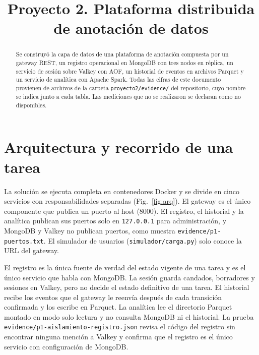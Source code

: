 \documentclass[conference]{IEEEtran}
\begin{document}
\sloppy

\title{Proyecto 2. Plataforma distribuida de anotación de datos}

\author{
}

\maketitle

\begin{abstract}
Se construyó la capa de datos de una plataforma de anotación compuesta por un gateway REST, un registro operacional en MongoDB con tres nodos en réplica, un servicio de sesión sobre Valkey con AOF, un historial de eventos en archivos Parquet y un servicio de analítica con Apache Spark. Todas las cifras de este documento provienen de archivos de la carpeta \texttt{proyecto2/evidence/} del repositorio, cuyo nombre se indica junto a cada tabla. Las mediciones que no se realizaron se declaran como no disponibles.
\end{abstract}

\section{Arquitectura y recorrido de una tarea}

La solución se ejecuta completa en contenedores Docker y se divide en cinco servicios con responsabilidades separadas (Fig.~\ref{fig:arq}). El gateway es el único componente que publica un puerto al host (8000). El registro, el historial y la analítica publican sus puertos solo en \texttt{127.0.0.1} para administración, y MongoDB y Valkey no publican puertos, como muestra \texttt{evidence/p1-puertos.txt}. El simulador de usuarios (\texttt{simulador/carga.py}) solo conoce la URL del gateway.

El registro es la única fuente de verdad del estado vigente de una tarea y es el único servicio que habla con MongoDB. La sesión guarda candados, borradores y sesiones en Valkey, pero no decide el estado definitivo de una tarea. El historial recibe los eventos que el gateway le reenvía después de cada transición confirmada y los escribe en Parquet. La analítica lee el directorio Parquet montado en modo solo lectura y no consulta MongoDB ni el historial. La prueba \texttt{evidence/p1-aislamiento-registro.json} revisa el código del registro sin encontrar ninguna mención a Valkey y confirma que el registro es el único servicio con configuración de MongoDB.
\end{document}
